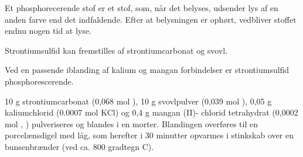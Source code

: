 




Et phosphorecerende stof er et stof, som, når det
belyses, udsender lys af en anden farve end det
indfaldende. Efter at belysningen er ophørt,
vedbliver stoffet endnu nogen tid at lyse.

Strontiumsulfid kan fremstilles af strontiumcarbonat
og svovl.
\begin{center}
\end{center}
Ved en passende iblanding af kalium og mangan
forbindelser er strontiumsulfid phosphorescerende.


10 g strontiumcarbonat (0,068 mol ), 10 g
svovlpulver (0,039 mol ), 0,05 g kaliumchlorid
(0.0007 mol KCl) og 0,4 g mangan (II)- chlorid
tetrahydrat (0,0002 mol , ) pulveriseres
og blandes i en morter.
Blandingen overføres til en porcelænsdigel med
låg, som herefter i 30 minutter opvarmes i
stinkskab over en bunsenbrænder (ved ca. 800
gradtegn C).
